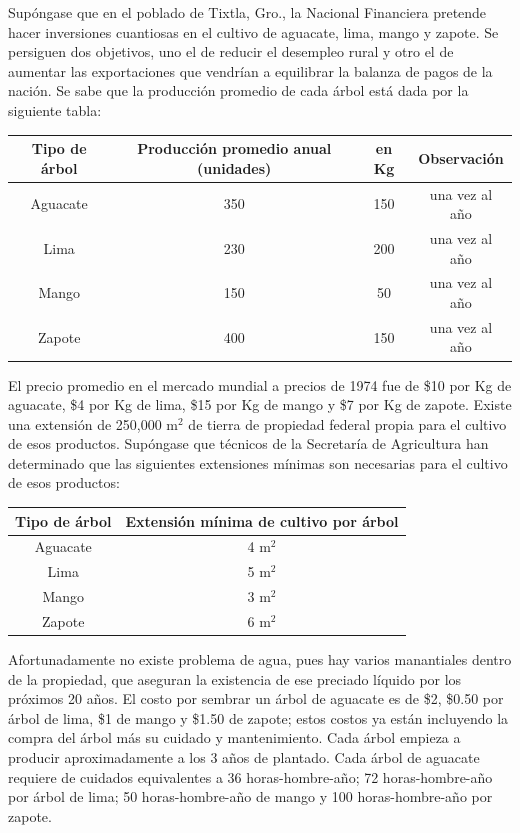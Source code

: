\begin{Ejer}
Sup\'ongase que en el poblado de Tixtla, Gro., la Nacional Financiera pretende hacer inversiones cuantiosas en el cultivo de aguacate, lima, mango y zapote. Se persiguen dos objetivos, uno el de reducir el desempleo rural y otro el de aumentar las exportaciones que vendr\'ian a equilibrar la balanza de pagos de la naci\'on. Se sabe que la producci\'on promedio de cada \'arbol est\'a dada por la siguiente tabla:

\begin{center}
\begin{tabular}{c|ccc}
Tipo de \'arbol & Producci\'on promedio anual (unidades) & en Kg & Observaci\'on \\
\hline
Aguacate & 350 & 150 & una vez al a\~no \\
Lima & 230 & 200 & una vez al a\~no \\
Mango & 150 & 50 & una vez al a\~no \\
Zapote & 400 & 150 & una vez al a\~no \\
\end{tabular}
\end{center}

El precio promedio en el mercado mundial a precios de 1974 fue de \$10 por Kg de aguacate, \$4 por Kg de lima, \$15 por Kg de mango y \$7 por Kg de zapote. Existe una extensi\'on de 250,000 m$^2$ de tierra de propiedad federal propia para el cultivo de esos productos. Sup\'ongase que t\'ecnicos de la Secretar\'ia de Agricultura han determinado que las siguientes extensiones m\'inimas son necesarias para el cultivo de esos productos:

\begin{center}
\begin{tabular}{c|c}
Tipo de \'arbol & Extensi\'on m\'inima de cultivo por \'arbol \\
\hline
Aguacate & 4 m$^2$ \\
Lima & 5 m$^2$ \\
Mango & 3 m$^2$ \\
Zapote & 6 m$^2$ \\
\end{tabular}
\end{center}

Afortunadamente no existe problema de agua, pues hay varios manantiales dentro de la propiedad, que aseguran la existencia de ese preciado l\'iquido por los pr\'oximos 20 a\~nos. El costo por sembrar un \'arbol de aguacate es de \$2, \$0.50 por \'arbol de lima, \$1 de mango y \$1.50 de zapote; estos costos ya est\'an incluyendo la compra del \'arbol m\'as su cuidado y mantenimiento. Cada \'arbol empieza a producir aproximadamente a los 3 a\~nos de plantado. Cada \'arbol de aguacate requiere de cuidados equivalentes a 36 horas-hombre-a\~no; 72 horas-hombre-a\~no por \'arbol de lima; 50 horas-hombre-a\~no de mango y 100 horas-hombre-a\~no por zapote.


\end{Ejer}
